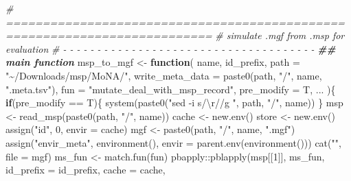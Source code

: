 \documentclass[
]{article}
\newenvironment{Shaded}{\begin{snugshade}}{\end{snugshade}}
\newcommand{\AttributeTok}[1]{\textcolor[rgb]{0.77,0.63,0.00}{#1}}
\newcommand{\CommentTok}[1]{\textcolor[rgb]{0.56,0.35,0.01}{\textit{#1}}}
\newcommand{\ControlFlowTok}[1]{\textcolor[rgb]{0.13,0.29,0.53}{\textbf{#1}}}
\newcommand{\DecValTok}[1]{\textcolor[rgb]{0.00,0.00,0.81}{#1}}
\newcommand{\DocumentationTok}[1]{\textcolor[rgb]{0.56,0.35,0.01}{\textbf{\textit{#1}}}}
\newcommand{\FunctionTok}[1]{\textcolor[rgb]{0.00,0.00,0.00}{#1}}
\newcommand{\NormalTok}[1]{#1}
\newcommand{\OtherTok}[1]{\textcolor[rgb]{0.56,0.35,0.01}{#1}}
\newcommand{\SpecialCharTok}[1]{\textcolor[rgb]{0.00,0.00,0.00}{#1}}
\newcommand{\StringTok}[1]{\textcolor[rgb]{0.31,0.60,0.02}{#1}}
\begin{document}
\begin{Shaded}
\begin{Highlighting}[]
\CommentTok{\# ==========================================================================}
\CommentTok{\# simulate .mgf from .msp for evaluation}
\CommentTok{\# {-} {-} {-} {-} {-} {-} {-} {-} {-} {-} {-} {-} {-} {-} {-} {-} {-} {-} {-} {-} {-} {-} {-} {-} {-} {-} {-} {-} {-} {-} {-} {-} {-} {-} {-} {-} {-}}
\DocumentationTok{\#\# main function}
\NormalTok{msp\_to\_mgf }\OtherTok{\textless{}{-}}
  \ControlFlowTok{function}\NormalTok{(}
\NormalTok{    name,}
\NormalTok{    id\_prefix,}
    \AttributeTok{path =} \StringTok{"\textasciitilde{}/Downloads/msp/MoNA/"}\NormalTok{,}
    \AttributeTok{write\_meta\_data =} \FunctionTok{paste0}\NormalTok{(path, }\StringTok{"/"}\NormalTok{, name, }\StringTok{".meta.tsv"}\NormalTok{),}
    \AttributeTok{fun =} \StringTok{"mutate\_deal\_with\_msp\_record"}\NormalTok{,}
    \AttributeTok{pre\_modify =}\NormalTok{ T,}
\NormalTok{    ...}
\NormalTok{    )\{}
    \ControlFlowTok{if}\NormalTok{(pre\_modify }\SpecialCharTok{==}\NormalTok{ T)\{}
      \FunctionTok{system}\NormalTok{(}\FunctionTok{paste0}\NormalTok{(}\StringTok{"sed {-}i \textquotesingle{}s/}\SpecialCharTok{\textbackslash{}r}\StringTok{//g\textquotesingle{} "}\NormalTok{, path, }\StringTok{"/"}\NormalTok{, name))}
\NormalTok{    \}}
\NormalTok{    msp }\OtherTok{\textless{}{-}} \FunctionTok{read\_msp}\NormalTok{(}\FunctionTok{paste0}\NormalTok{(path, }\StringTok{"/"}\NormalTok{, name))}
\NormalTok{    cache }\OtherTok{\textless{}{-}} \FunctionTok{new.env}\NormalTok{()}
\NormalTok{    store }\OtherTok{\textless{}{-}} \FunctionTok{new.env}\NormalTok{()}
    \FunctionTok{assign}\NormalTok{(}\StringTok{"id"}\NormalTok{, }\DecValTok{0}\NormalTok{, }\AttributeTok{envir =}\NormalTok{ cache)}
\NormalTok{    mgf }\OtherTok{\textless{}{-}} \FunctionTok{paste0}\NormalTok{(path, }\StringTok{"/"}\NormalTok{, name, }\StringTok{".mgf"}\NormalTok{)}
    \FunctionTok{assign}\NormalTok{(}\StringTok{"envir\_meta"}\NormalTok{, }\FunctionTok{environment}\NormalTok{(), }\AttributeTok{envir =} \FunctionTok{parent.env}\NormalTok{(}\FunctionTok{environment}\NormalTok{()))}
    \FunctionTok{cat}\NormalTok{(}\StringTok{""}\NormalTok{, }\AttributeTok{file =}\NormalTok{ mgf)}
\NormalTok{    ms\_fun }\OtherTok{\textless{}{-}} \FunctionTok{match.fun}\NormalTok{(fun)}
\NormalTok{    pbapply}\SpecialCharTok{::}\FunctionTok{pblapply}\NormalTok{(msp[[}\DecValTok{1}\NormalTok{]], ms\_fun, }
      \AttributeTok{id\_prefix =}\NormalTok{ id\_prefix,}
      \AttributeTok{cache =}\NormalTok{ cache,}

\end{Highlighting}
\end{Shaded}
\end{document}

